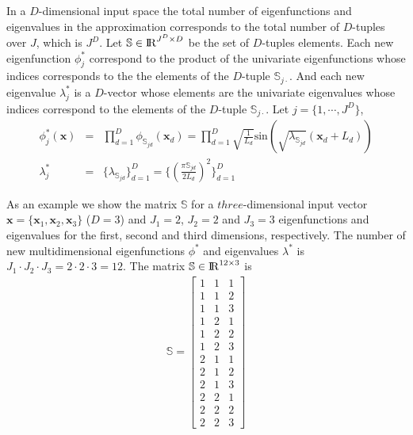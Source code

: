 \documentclass[]{interact}
\theoremstyle{plain}%
\theoremstyle{definition}
\theoremstyle{remark}
\begin{document}
\vspace{0.2cm}
In a $D$-dimensional input space the total number of eigenfunctions and eigenvalues in the approximation corresponds to the total number of $D$-tuples over $J$, which is $J^D$. Let $\mathbb{S}\in {\rm I\!R}^{J^D \times D}$ be the set of $D$-tuples elements. Each new eigenfunction $\phi^{\ast}_j$ correspond to the product of the univariate eigenfunctions whose indices corresponds to the the elements of the $D$-tuple $\mathbb{S}_{j\cdotp}$. And each new eigenvalue $\lambda^{\ast}_j$ is a $D$-vector whose elements are the univariate eigenvalues whose indices correspond to the elements of the $D$-tuple $\mathbb{S}_{j\cdotp}$. Let $j=\{1,\cdots,J^D\}$,
%
\begin{eqnarray}
\phi^{\ast}_j(\mathbf{x}) &=& \prod_{d=1}^{D} \phi_{\mathbb{S}_{jd}}(\mathbf{x}_d) = \prod_{d=1}^{D} \sqrt{\frac{1}{L_d}} \text{sin}\left(\sqrt{\lambda_{\mathbb{S}_{jd}}}(\mathbf{x}_d+L_d)\right)  \nonumber \\
%
\lambda^{\ast}_j &=& \{\lambda_{\mathbb{S}_{jd}} \}_{d=1}^D =  \{ \left(\tfrac{\pi \mathbb{S}_{jd}}{2L_d}\right)^2 \}_{d=1}^D  \nonumber
\end{eqnarray}

As an example we show the matrix $\mathbb{S}$ for a $three$-dimensional input vector $\mathbf{x}=\{\mathbf{x}_1,\mathbf{x}_2,\mathbf{x}_3\}$ ($D=3$) and $J_{1}=2$, $J_{2}=2$ and $J_{3}=3$ eigenfunctions and eigenvalues for the first, second and third dimensions, respectively. The number of new multidimensional eigenfunctions $\phi^{\ast}$ and eigenvalues $\lambda^{\ast}$ is $J_{1}\cdot J_{2}\cdot J_{3}=2\cdot 2\cdot 3=12$. The matrix $\mathbb{S}\in {\rm I\!R}^{12 \times 3}$ is
%
\begin{eqnarray}
\mathbb{S}=
\left[ {\begin{array}{ccc}
1 & 1 & 1 \nonumber \\
1 & 1 & 2 \\
1 & 1 & 3 \\
1 & 2 & 1 \\
1 & 2 & 2 \\
1 & 2 & 3 \\
2 & 1 & 1 \\
2 & 1 & 2 \\
2 & 1 & 3 \\
2 & 2 & 1 \\
2 & 2 & 2 \\
2 & 2 & 3 
\end{array} } \right]
\end{eqnarray} 
\end{document}
